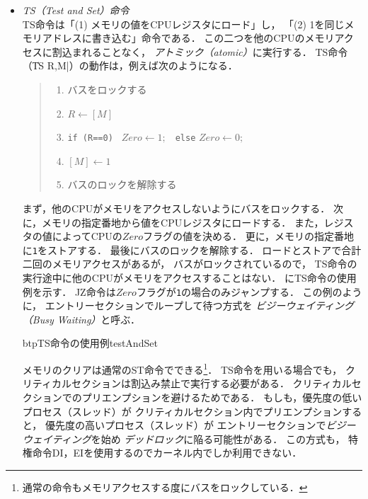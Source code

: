 \begin{itemize}
\item \emph{TS（Test and Set）命令} \\
  TS命令は「(1) メモリの値をCPUレジスタにロード」し，
  「(2) 1を同じメモリアドレスに書き込む」命令である．
  この二つを他のCPUのメモリアクセスに割込まれることなく，
  \emph{アトミック（atomic）}に実行する．
  TS命令（\|TS R,M|）の動作は，例えば次のようになる．

  \begin{quote}
    \begin{enumerate}
    \item バスをロックする
    \item $R \leftarrow [M]$
    \item \texttt{if (R==0) } $Zero \leftarrow 1;$
      \texttt{~else} $Zero \leftarrow 0;$
    \item $[M] \leftarrow 1$
    \item バスのロックを解除する
    \end{enumerate}
  \end{quote}

  まず，他のCPUがメモリをアクセスしないようにバスをロックする．
  次に，メモリの指定番地から値をCPUレジスタにロードする．
  また，レジスタの値によってCPUの$Zero$フラグの値を決める．
  更に，メモリの指定番地に\texttt{1}をストアする．
  最後にバスのロックを解除する．
  ロードとストアで合計二回のメモリアクセスがあるが，
  バスがロックされているので，
  TS命令の実行途中に他のCPUがメモリをアクセスすることはない．
  にTS命令の使用例を示す．
  JZ命令は$Zero$フラグが\texttt{1}の場合のみジャンプする．
  この例のように，
  エントリーセクションでループして待つ方式を
  \emph{ビジーウェイティング（Busy Waiting）}と呼ぶ．

  \begin{myfig}{btp}{TS命令の使用例}{testAndSet}
    
  \end{myfig}

  メモリのクリアは通常のST命令でできる\footnote{
    通常の命令もメモリアクセスする度にバスをロックしている．}．
  TS命令を用いる場合でも，
  クリティカルセクションは割込み禁止で実行する必要がある．
  クリティカルセクションでのプリエンプションを避けるためである．
  もしも，優先度の低いプロセス（スレッド）が
  クリティカルセクション内でプリエンプションすると，
  優先度の高いプロセス（スレッド）が
  エントリーセクションで\emph{ビジーウェイティング}を始め
  \emph{デッドロック}に陥る可能性がある．
  この方式も，
  特権命令DI，EIを使用するのでカーネル内でしか利用できない．


\end{itemize}
